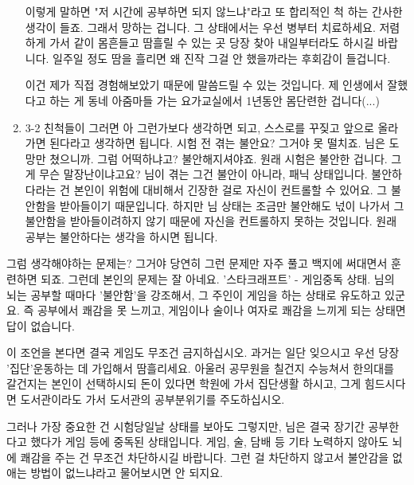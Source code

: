 \begin{enumerate}
    이렇게 말하면 "저 시간에 공부하면 되지 않느냐"라고 또 합리적인 척 하는 간사한 생각이 들죠.
    그래서 망하는 겁니다.
    그 상태에서는 우선 병부터 치료하세요.
    저렴하게 가서 같이 몸흔들고 땀흘릴 수 있는 곳 당장 찾아 내일부터라도 하시길 바랍니다.
    일주일 정도 땀을 흘리면 왜 진작 그걸 안 했을까라는 후회감이 들겁니다.
    \vspace{5mm}
    
    이건 제가 직접 경험해보았기 때문에 말씀드릴 수 있는 것입니다.
    제 인생에서 잘했다고 하는 게 동네 아줌마들 가는 요가교실에서 1년동안 몸단련한 겁니다(...)
    \vspace{5mm}
    
    \item 3-2 친척들이 그러면 아 그런가보다 생각하면 되고, 스스로를 꾸짖고 앞으로 올라가면 된다라고 생각하면 됩니다.
    시험 전 겪는 불안요? 그거야 못 떨치죠. 님은 도망만 쳤으니까.
    그럼 어떡하냐고? 불안해지셔야죠. 원래 시험은 불안한 겁니다.
    그게 무슨 말장난이냐고요?
    님이 겪는 그건 불안이 아니라, 패닉 상태입니다.
    불안하다라는 건 본인이 위험에 대비해서 긴장한 걸로 자신이 컨트롤할 수 있어요. 그 불안함을 받아들이기 때문입니다.
    하지만 님 상태는 조금만 불안해도 넋이 나가서 그 불안함을 받아들이려하지 않기 때문에 자신을 컨트롤하지 못하는 것입니다.
    원래 공부는 불안하다는 생각을 하시면 됩니다.
    \vspace{5mm}
\end{enumerate}

그럼 생각해야하는 문제는?
그거야 당연히 그런 문제만 자주 풀고 백지에 써대면서 훈련하면 되죠.
그런데 본인의 문제는 잘 아네요. '스타크래프트' - 게임중독 상태.
님의 뇌는 공부할 때마다 '불안함'을 강조해서, 그 주인이 게임을 하는 상태로 유도하고 있군요.
즉 공부에서 쾌감을 못 느끼고, 게임이나 술이나 여자로 쾌감을 느끼게 되는 상태면 답이 없습니다.
\vspace{5mm}

이 조언을 본다면 결국 게임도 무조건 금지하십시오.
과거는 일단 잊으시고 우선 당장 '집단'운동하는 데 가입해서 땀흘리세요.
아울러 공무원을 칠건지 수능쳐서 한의대를 갈건지는 본인이 선택하시되
돈이 있다면 학원에 가서 집단생활 하시고, 그게 힘드시다면 도서관이라도 가서 도서관의 공부분위기를 주도하십시오.
\vspace{5mm}

그러나 가장 중요한 건 시험당일날 상태를 보아도 그렇지만,
님은 결국 장기간 공부한다고 했다가 게임 등에 중독된 상태입니다.
게임, 술, 담배 등 기타 노력하지 않아도 뇌에 쾌감을 주는 건 무조건 차단하시길 바랍니다.
그런 걸 차단하지 않고서 불안감을 없애는 방법이 없느냐라고 물어보시면 안 되지요.
\vspace{5mm}






